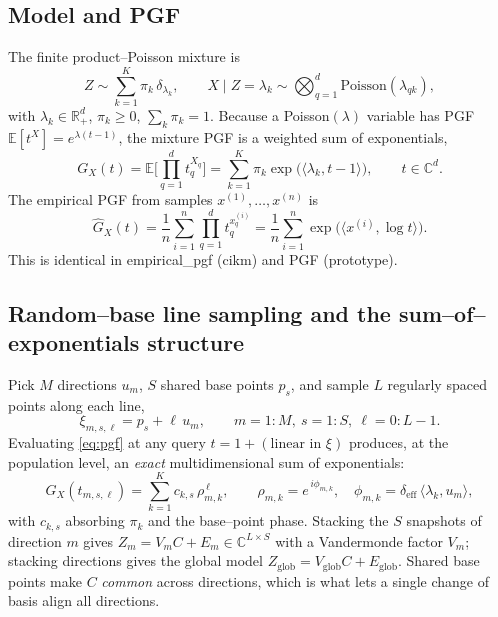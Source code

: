 \documentclass[11pt]{article}
\newcommand{\R}{\mathbb{R}}
\newcommand{\C}{\mathbb{C}}
\newcommand{\E}{\mathbb{E}}
\newcommand{\inner}[2]{\langle #1, #2 \rangle}
\newcommand{\lam}{\bm{\lambda}}
\newcommand{\bu}{\bm{u}}
\newcommand{\bp}{\bm{p}}
\newcommand{\bt}{\bm{t}}
\newcommand{\bxi}{\bm{\xi}}
\newcommand{\bx}{\bm{x}}
\newcommand{\deff}{\delta_{\mathrm{eff}}}
\newcommand{\code}[1]{\texttt{\small #1}}
\def\code#1{#1}%
\def\small{}%
\def\bm#1{#1}%
\def\bt{t}%
\theoremstyle{definition}
\begin{document}
\subsection{Model and PGF}
The finite product--Poisson mixture is
\begin{equation}
Z \sim \sum_{k=1}^{K}\pi_k\,\delta_{\lam_k},
\qquad
X \mid Z=\lam_k \sim \bigotimes_{q=1}^{d}\mathrm{Poisson}(\lambda_{qk}),
\label{eq:model}
\end{equation}
with $\lam_k\in\R^d_+$, $\pi_k\ge0$, $\sum_k\pi_k=1$. Because a Poisson$(\lambda)$ variable has
PGF $\E[t^X]=e^{\lambda(t-1)}$, the mixture PGF is a weighted sum of exponentials,
\begin{equation}
G_X(\bt)=\E\!\Big[\textstyle\prod_{q=1}^d t_q^{X_q}\Big]
        =\sum_{k=1}^{K}\pi_k\exp\!\big(\inner{\lam_k}{\bt-\bm 1}\big),
\qquad \bt\in\C^d .
\label{eq:pgf}
\end{equation}
The empirical PGF from samples $\bx^{(1)},\dots,\bx^{(n)}$ is
\begin{equation}
\widehat G_X(\bt)=\frac1n\sum_{i=1}^{n}\prod_{q=1}^d t_q^{x^{(i)}_q}
                 =\frac1n\sum_{i=1}^{n}\exp\!\big(\inner{\bx^{(i)}}{\log\bt}\big).
\label{eq:epgf}
\end{equation}
This is identical in \code{empirical\_pgf} (cikm) and \code{PGF} (prototype).

\subsection{Random--base line sampling and the sum--of--exponentials structure}
Pick $M$ directions $\bu_m$, $S$ shared base points $\bp_s$, and sample $L$ regularly
spaced points along each line,
\begin{equation}
\bxi_{m,s,\ell} = \bp_s + \ell\,\bu_m,
\qquad m=1{:}M,\ s=1{:}S,\ \ell=0{:}L-1 .
\label{eq:lines}
\end{equation}
Evaluating \eqref{eq:pgf} at any query $\bt = \bm1 + (\text{linear in }\bxi)$ produces, at the
population level, an \emph{exact} multidimensional sum of exponentials:
\begin{equation}
G_X(\bt_{m,s,\ell})=\sum_{k=1}^{K} c_{k,s}\,\rho_{m,k}^{\,\ell},
\qquad
\rho_{m,k}=e^{\,i\phi_{m,k}},\quad \phi_{m,k}=\deff\,\inner{\lam_k}{\bu_m},
\label{eq:soe}
\end{equation}
with $c_{k,s}$ absorbing $\pi_k$ and the base--point phase. Stacking the $S$ snapshots of
direction $m$ gives $Z_m = V_m C + E_m \in\C^{L\times S}$ with a Vandermonde factor $V_m$;
stacking directions gives the global model $Z_{\mathrm{glob}} = V_{\mathrm{glob}}C + E_{\mathrm{glob}}$.
Shared base points make $C$ \emph{common} across directions, which is what lets a single
change of basis align all directions.
\end{document}
